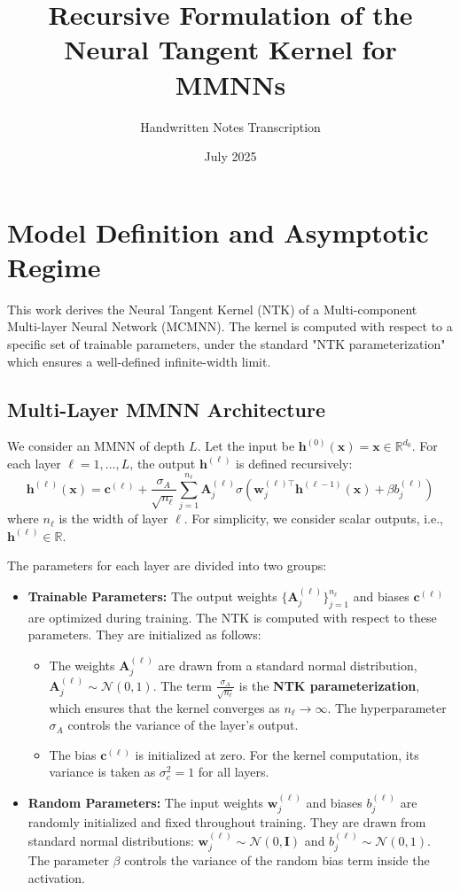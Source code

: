 \documentclass[12pt]{article}
\title{Recursive Formulation of the Neural Tangent Kernel for MMNNs}
\author{Handwritten Notes Transcription}
\date{July 2025}
\begin{document}
\maketitle

\section{Model Definition and Asymptotic Regime}
This work derives the Neural Tangent Kernel (NTK) of a Multi-component Multi-layer Neural Network (MCMNN). The kernel is computed with respect to a specific set of trainable parameters, under the standard "NTK parameterization" which ensures a well-defined infinite-width limit.

\subsection{Multi-Layer MMNN Architecture}
We consider an MMNN of depth $L$. Let the input be $\bm{h}^{(0)}(\bm{x}) = \bm{x} \in \mathbb{R}^{d_0}$. For each layer $\ell = 1, \dots, L$, the output $\bm{h}^{(\ell)}$ is defined recursively:
\begin{equation}
    \bm{h}^{(\ell)}(\bm{x}) = \bm{c}^{(\ell)} + \frac{\sigma_A}{\sqrt{n_\ell}} \sum_{j=1}^{n_\ell} \bm{A}_j^{(\ell)} \sigma\left(\bm{w}_j^{(\ell)\top} \bm{h}^{(\ell-1)}(\bm{x}) + \beta b_j^{(\ell)}\right)
\end{equation}
where $n_\ell$ is the width of layer $\ell$. For simplicity, we consider scalar outputs, i.e., $\bm{h}^{(\ell)} \in \mathbb{R}$.

The parameters for each layer are divided into two groups:
\begin{itemize}
    \item \textbf{Trainable Parameters:} The output weights $\{\bm{A}_j^{(\ell)}\}_{j=1}^{n_\ell}$ and biases $\bm{c}^{(\ell)}$ are optimized during training. The NTK is computed with respect to these parameters. They are initialized as follows:
    \begin{itemize}
        \item The weights $\bm{A}_j^{(\ell)}$ are drawn from a standard normal distribution, $\bm{A}_j^{(\ell)} \sim \mathcal{N}(0, 1)$. The term $\frac{\sigma_A}{\sqrt{n_\ell}}$ is the \textbf{NTK parameterization}, which ensures that the kernel converges as $n_\ell \to \infty$. The hyperparameter $\sigma_A$ controls the variance of the layer's output.
        \item The bias $\bm{c}^{(\ell)}$ is initialized at zero. For the kernel computation, its variance is taken as $\sigma_c^2 = 1$ for all layers.
    \end{itemize}
    \item \textbf{Random Parameters:} The input weights $\bm{w}_j^{(\ell)}$ and biases $b_j^{(\ell)}$ are randomly initialized and fixed throughout training. They are drawn from standard normal distributions: $\bm{w}_j^{(\ell)} \sim \mathcal{N}(0, \mathbf{I})$ and $b_j^{(\ell)} \sim \mathcal{N}(0, 1)$. The parameter $\beta$ controls the variance of the random bias term inside the activation.
\end{itemize}
\end{document}

